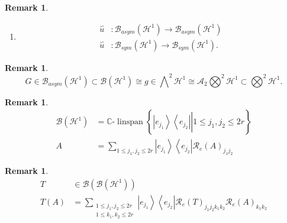 \documentclass[aps,preprint]{revtex4}%
\newtheorem{remark}[theorem]{Remark}
\begin{document}
\begin{enumerate}
\begin{remark}
\begin{enumerate}
\item
\begin{align}
\overset{\backsim}{u}  &  :\mathcal{B}_{asym}\left(  \mathcal{H}^{1}\right)
\rightarrow\mathcal{B}_{asym}\left(  \mathcal{H}^{1}\right) \\
\overset{\backsim}{u}  &  :\mathcal{B}_{sym}\left(  \mathcal{H}^{1}\right)
\rightarrow\mathcal{B}_{sym}\left(  \mathcal{H}^{1}\right)  .
\end{align}

\end{enumerate}
\end{remark}

\begin{remark}%
\begin{equation}
G\in\mathcal{B}_{asym}\left(  \mathcal{H}^{1}\right)  \subset\mathcal{B}%
\left(  \mathcal{H}^{1}\right)  \cong g\in%
{\textstyle\bigwedge\nolimits^{2}}
\mathcal{H}^{1}\cong\mathcal{A}_{2}%
{\textstyle\bigotimes\nolimits^{2}}
\mathcal{H}^{1}\subset%
{\textstyle\bigotimes\nolimits^{2}}
\mathcal{H}^{1}.
\end{equation}

\end{remark}

\begin{remark}%
\begin{align}
\mathcal{B}\left(  \mathcal{H}^{1}\right)   &  =\mathbb{C}\text{-}%
\operatorname*{linspan}\left\{  \left.  \overset{}{\left\vert e_{j_{1}%
}\right\rangle \left\langle e_{j_{2}}\right\vert }\right\vert 1\leq
j_{1},j_{2}\leq2r\right\} \\
A  &  =\sum\limits_{1\leq j_{1},j_{2}\leq2r}\left\vert e_{j_{1}}\right\rangle
\left\langle e_{j_{2}}\right\vert \mathcal{R}_{e}\left(  A\right)
_{j_{1}j_{2}}%
\end{align}

\end{remark}

\begin{remark}%
\begin{align}
T  &  \in\mathcal{B}\left(  \mathcal{B}\left(  \mathcal{H}^{1}\right)  \right)
\\
T\left(  A\right)   &  =\sum\limits_{\substack{1\leq j_{1},j_{2}\leq2r\\1\leq
k_{1},k_{2}\leq2r}}\left\vert e_{j_{1}}\right\rangle \left\langle e_{j_{2}%
}\right\vert \mathcal{R}_{e}\left(  T\right)  _{j_{1}j_{2}k_{1}k_{2}%
}\mathcal{R}_{e}\left(  A\right)  _{k_{1}k_{2}}%
\end{align}


\end{remark}
\end{enumerate}
\end{document}
